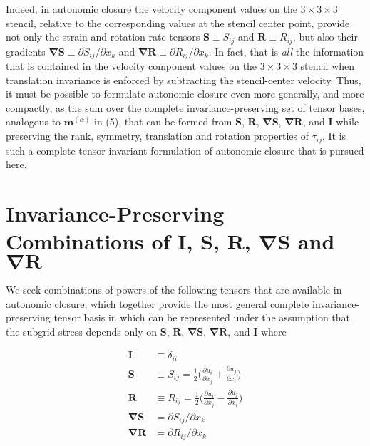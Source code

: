 Indeed, in autonomic closure the velocity component values on the $3 \times 3\times 3$  stencil, relative to the corresponding values at the stencil center point, provide not only the strain and rotation rate tensors $\mathbf{S} \equiv S_{ij}$  and $\mathbf{R} \equiv R_{ij}$, but also their gradients  $\mathbf{\nabla S} \equiv \partial S_{ij}/ \partial x_{k}$ and $\mathbf{\nabla R} \equiv \partial R_{ij}/ \partial x_{k}$. In fact, that is \textit{all} the information that is contained in the velocity component values on the $3 \times 3\times 3$  stencil when translation invariance is enforced by subtracting the stencil-center velocity. Thus, it must be possible to formulate autonomic closure even more generally, and more compactly, as the sum over the complete invariance-preserving set of tensor bases, analogous to  $\mathbf{m}^{(\alpha)}$ in (5), that can be formed from $\mathbf{S}$, $\mathbf{R}$, $\mathbf{\nabla S}$, $\mathbf{\nabla R}$, and $\mathbf{I}$  while preserving the rank, symmetry, translation and rotation properties of $\tau_{ij}$. It is such a complete tensor invariant formulation of autonomic closure that is pursued here. 

\section{Invariance-Preserving Combinations of $\mathbf{I}$, $\mathbf{S}$, $\mathbf{R}$, $\mathbf{\nabla S}$ and $\mathbf{\nabla R}$ }

We seek combinations of powers of the following tensors that are available in autonomic closure, which together provide the most general complete invariance-preserving tensor basis in which   can be represented under the assumption that the subgrid stress depends only on $\mathbf{S}$, $\mathbf{R}$, $\mathbf{\nabla S}$, $\mathbf{\nabla R}$, and $\mathbf{I}$ where

%
\begin{subequations}
\begin{align}
	\label{E:25}
		\mathbf{I} &\equiv \delta_{ii} \\
		\mathbf{S} &\equiv S_{ij} = \frac{1}{2} \bigg( \frac{\partial u_i}{\partial x_j} + \frac{\partial u_j}{ \partial x_i} \bigg)  \\
		\mathbf{R} &\equiv R_{ij} = \frac{1}{2} \bigg( \frac{\partial u_i}{\partial x_j} - \frac{\partial u_j}{ \partial x_i} \bigg) \\
		\mathbf{\nabla S} &= \partial S_{ij}/ \partial x_{k} \\
		\mathbf{\nabla R} &= \partial R_{ij}/ \partial x_{k}
\end{align}
\end{subequations}
%
%    

